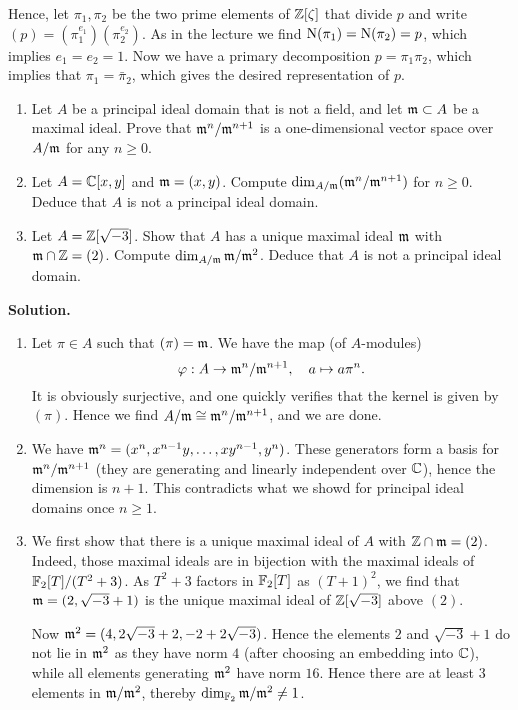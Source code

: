 \documentclass[a4paper,11pt]{article}
\begin{document}
\begin{enumerate}
        Hence, let $\pi_1, \pi_2$ be the two prime elements of 
        $\mathbb{Z}[\zeta]$ that divide $p$ and write $(p) = (\pi_1^{e_1})(\pi_2^{e_2})$. 
        As in the lecture we find $\operatorname{N}(\pi_1) = \operatorname{N}(\pi_2) = p$, which 
        implies $e_1 = e_2 = 1$. Now we have a primary decomposition 
        $p = \pi_1 \pi_2$, which implies that $\pi_1 = \bar \pi_2$, which
        gives the desired representation of $p$. 

\end{enumerate}

\begin{enumerate}
    \item Let $A$ be a principal ideal domain that is not a field, and let $\mathfrak{m}
        \subset A$ be a maximal ideal. Prove that $\mathfrak{m}^n/\mathfrak{m}^{n+1}$ is a
        one-dimensional vector space over $A/\mathfrak{m}$ for any $n \geq 0$. 
    \item Let $A = \mathbb{C}[x,y]$ and $\mathfrak{m} = (x,y)$. Compute $\dim_{A/\mathfrak{m}} (\mathfrak{m}^n
        /\mathfrak{m}^{n+1})$ for $n \geq 0$. Deduce that $A$ is not a principal ideal
        domain. 
    \item Let $A = \mathbb{Z}[\sqrt{-3}]$. Show that $A$ has a unique maximal ideal $\mathfrak{m}$
        with $\mathfrak{m} \cap \mathbb{Z} = (2)$. Compute $\dim_{A/\mathfrak{m}} \mathfrak{m}/\mathfrak{m}^2$. Deduce that 
        $A$ is not a principal ideal domain.
\end{enumerate}

\textbf{Solution.}
\begin{enumerate}
    \item Let $\pi \in A$ such that $(\pi) = \mathfrak{m}$. We have the map (of $A$-modules)
        $$\varphi: A \to \mathfrak{m}^n/\mathfrak{m}^{n+1}, \quad a \mapsto a \pi^n.$$
        It is obviously surjective, and one quickly verifies that the kernel is
        given by $(\pi)$. Hence we find $A/\mathfrak{m} \cong \mathfrak{m}^n/\mathfrak{m}^{n+1}$, and we
        are done. 
    \item We have $\mathfrak{m}^n = (x^n, x^{n-1}y, \dots, xy^{n-1},y^n)$. These generators
        form a basis for $\mathfrak{m}^{n}/\mathfrak{m}^{n+1}$ (they are generating and linearly
        independent over $\mathbb{C}$), hence the dimension is $n+1$. This contradicts
        what we showd for principal ideal domains once $n \geq 1$. 
    \item We first show that there is a unique maximal ideal of $A$ with 
        $\mathbb{Z} \cap \mathfrak{m} = (2)$. Indeed, those maximal ideals are in bijection with
        the maximal ideals of $\mathbb{F}_2[T]/(T^2 + 3)$. As $T^2 + 3$ factors in 
        $\mathbb{F}_2[T]$ as $(T+1)^2$, we find that $\mathfrak{m} = (2, \sqrt{-3} + 1)$ is the
        unique maximal ideal of $\mathbb{Z}[\sqrt{-3}]$ above $(2)$. 

        Now $\mathfrak{m}^2 = (4, 2 \sqrt{-3} + 2, -2 + 2\sqrt{-3})$. Hence the elements
        $2$ and $\sqrt{-3}+1$ do not lie in $\mathfrak{m}^2$ as they have norm $4$ (after
        choosing an embedding into $\mathbb{C}$), while all elements generating
        $\mathfrak{m}^2$ have norm $16$. Hence there are at least $3$ elements in 
        $\mathfrak{m}/\mathfrak{m}^2$, thereby $\dim_{\mathbb{F}_2}{\mathfrak{m}/\mathfrak{m}^2} \neq 1$. 
\end{enumerate}
\end{document}
